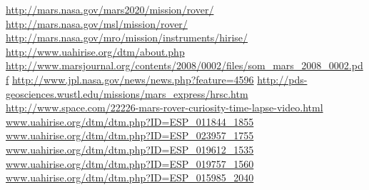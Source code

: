 \documentclass[12pt]{article}
\begin{document}
\clearpage
\begin{thebibliography}{30}
  \url{http://mars.nasa.gov/mars2020/mission/rover/}
  \url{http://mars.nasa.gov/msl/mission/rover/}
  \url{http://mars.nasa.gov/mro/mission/instruments/hirise/}
  \url{http://www.uahirise.org/dtm/about.php}
  \url{http://www.marsjournal.org/contents/2008/0002/files/som_mars_2008_0002.pdf}
  \url{http://www.jpl.nasa.gov/news/news.php?feature=4596}
  \url{http://pds-geosciences.wustl.edu/missions/mars_express/hrsc.htm}
  \url{http://www.space.com/22226-mars-rover-curiosity-time-lapse-video.html}
  \url{www.uahirise.org/dtm/dtm.php?ID=ESP_011844_1855}
  \url{www.uahirise.org/dtm/dtm.php?ID=ESP_023957_1755}
  \url{www.uahirise.org/dtm/dtm.php?ID=ESP_019612_1535}
  \url{www.uahirise.org/dtm/dtm.php?ID=ESP_019757_1560}
  \url{www.uahirise.org/dtm/dtm.php?ID=ESP_015985_2040}
\end{thebibliography}
\end{document}
